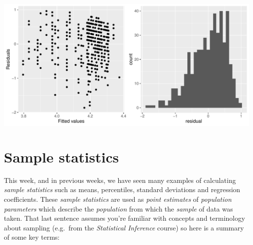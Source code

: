 \documentclass[
  letterpaper,
  DIV=11,
  numbers=noendperiod]{scrartcl}
\begin{document}
\begin{tcolorbox}
\begin{center}
\includegraphics{notes_files/figure-pdf/unnamed-chunk-16-1.pdf}
\end{center}

\end{tcolorbox}

\section{Sample statistics}\label{sample-statistics}

This week, and in previous weeks, we have seen many examples of
calculating \emph{sample statistics} such as means, percentiles,
standard deviations and regression coefficients. These \emph{sample
statistics} are used as \emph{point estimates} of \emph{population
parameters} which describe the \emph{population} from which the
\emph{sample} of data was taken. That last sentence assumes you're
familiar with concepts and terminology about sampling (e.g.~from the
\emph{Statistical Inference} course) so here is a summary of some key
terms:
\end{document}
